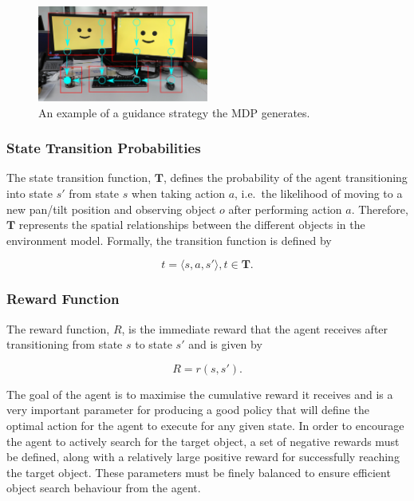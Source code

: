 \documentclass[a4paper, twoside]{article}
\begin{document}
\begin{figure}
  \centering
  \includegraphics[width=0.5\textwidth]{figures/office_desk_example.png}
  \caption{An example of a guidance strategy the MDP generates. }\label{fig:route-example}
\end{figure}

\subsubsection{State Transition Probabilities}

\noindent The state transition function, $\mathbf{T}$, defines the probability of the agent transitioning into state $s'$ from state $s$ when taking action $a$, i.e.\ the likelihood of moving to a new pan/tilt position and observing object $o$ after performing action $a$. Therefore, $\mathbf{T}$ represents the spatial relationships between the different objects in the environment model. Formally, the transition function is defined by

\begin{equation}
  t=\langle{}s, a, s'\rangle, t\in{}\mathbf{T}.
\end{equation}

\subsubsection{Reward Function}

\noindent The reward function, $R$, is the immediate reward that the agent receives after transitioning from state $s$ to state $s'$ and is given by 

\begin{equation}
  R = r(s, s').
\end{equation} 

The goal of the agent is to maximise the cumulative reward it receives and is a very important parameter for producing a good policy that will define the optimal action for the agent to execute for any given state. In order to encourage the agent to actively search for the target object, a set of negative rewards must be defined, along with a relatively large positive reward for successfully reaching the target object. These parameters must be finely balanced to ensure efficient object search behaviour from the agent.
\end{document}
